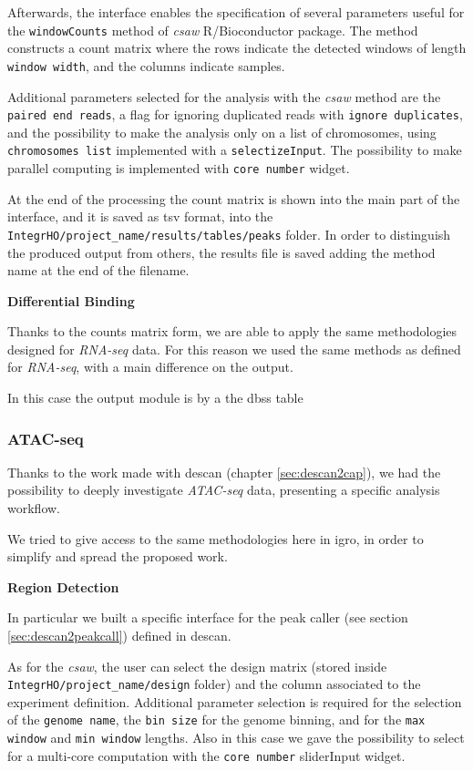 Afterwards, the interface enables the specification of several parameters useful for the \lstinline!windowCounts! method of \textit{csaw} R/Bioconductor package.
The method constructs a count matrix where the rows indicate the detected windows of length \lstinline!window width!, and the columns indicate samples.

Additional parameters selected for the analysis with the \textit{csaw} method are the \lstinline!paired end reads!, a flag for ignoring duplicated reads with \lstinline!ignore duplicates!, and the possibility to make the analysis only on a list of chromosomes, using \lstinline!chromosomes list! implemented with a \lstinline!selectizeInput!.
The possibility to make parallel computing is implemented with \lstinline!core number! widget.

At the end of the processing the count matrix is shown into the main part of the interface, and it is saved as \gls{tsv} format, into the \lstinline!IntegrHO/project_name/results/tables/peaks! folder.
In order to distinguish the produced output from others, the results file is saved adding the method name at the end of the filename.

{\setlength{\parindent}{0cm}\textbf{Differential Binding}}

Thanks to the counts matrix form, we are able to apply the same methodologies designed for \textit{RNA-seq} data.
For this reason we used the same  methods as defined for \textit{RNA-seq}, with a main difference on the output.

In this case the output module is by a the \glspl{dbs} table


\subsubsection{ATAC-seq}

Thanks to the work made with \gls{descan} (chapter \ref{sec:descan2cap}), we had the possibility to deeply investigate \textit{ATAC-seq} data, presenting a specific analysis workflow.

We tried to give access to the same methodologies here in \gls{igro}, in order to simplify and spread the proposed work.


{\setlength{\parindent}{0cm}\textbf{Region Detection}}

In particular we built a specific interface for the peak caller (see section \ref{sec:descan2peakcall}) defined in \gls{descan}.

As for the \textit{csaw}, the user can select the design matrix (stored inside \lstinline!IntegrHO/project_name/design! folder) and the column associated to the experiment definition.
Additional parameter selection is required for the selection of the \lstinline!genome name!, the \lstinline!bin size! for the genome binning, and for the \lstinline!max window! and \lstinline!min window! lengths.
Also in this case we gave the possibility to select for a multi-core computation with the \lstinline!core number! sliderInput widget.

